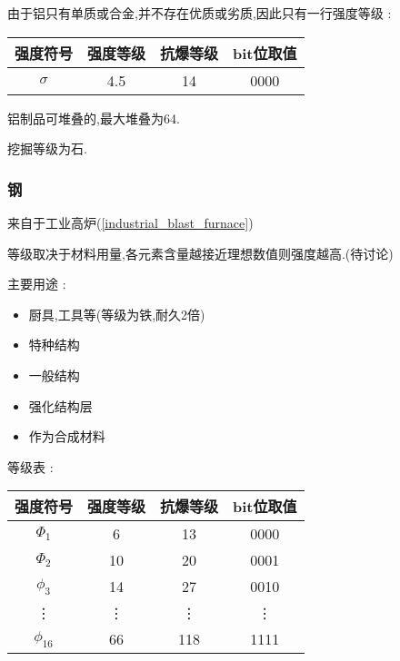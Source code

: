 {{{          由于铝只有单质或合金,并不存在优质或劣质,因此只有一行强度等级 :
          \begin{center}
              \begin{tabular}{|c|c|c|c|}
                  \hline
                  强度符号 & 强度等级 & 抗爆等级 & bit位取值 \\
                  \hline
                  $\sigma$ & 4.5      & 14       & 0000      \\
                  \hline
              \end{tabular}
          \end{center}

          铝制品可堆叠的,最大堆叠为64.

          挖掘等级为石.
      }

      \subsubsection{钢}{
          来自于工业高炉({\ref{industrial_blast_furnace}})

          等级取决于材料用量,各元素含量越接近理想数值则强度越高.(待讨论)

          主要用途 :
          \begin{itemize}[itemsep=1pt]
              \item 厨具,工具等(等级为铁,耐久2倍)
              \item 特种结构
              \item 一般结构
              \item 强化结构层
              \item 作为合成材料
          \end{itemize}

          等级表 :

          \begin{center}
              \begin{tabular}{|c|c|c|c|}
                  \hline
                  强度符号  & 强度等级 & 抗爆等级 & bit位取值 \\
                  \hline
                  $\Phi_1$  & 6        & 13       & 0000      \\
                  \hline
                  $\Phi_2$  & 10       & 20       & 0001      \\
                  \hline
                  $\phi_3$  & 14       & 27       & 0010      \\
                  \vdots    & \vdots   & \vdots   & \vdots    \\
                  $\phi_16$ & 66       & 118      & 1111      \\
                  \hline
              \end{tabular}
          \end{center}

}}}
